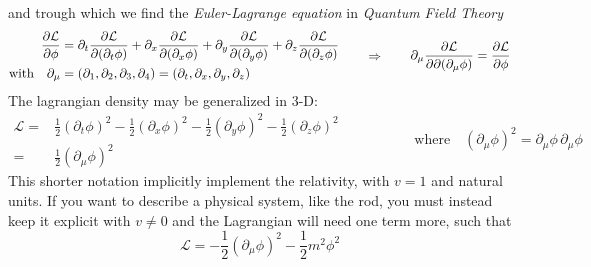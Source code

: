 \documentclass[class=article]{standalone}
\begin{document}
and trough which we find the \emph{Euler-Lagrange equation} in \emph{Quantum Field Theory}
\begin{equation*}
\begin{split}
\pdv{\mathcal{L}}{\phi} & = \partial_t \pdv{\mathcal{L}}{(\partial_t \phi)} + \partial_x \pdv{\mathcal{L}}{(\partial_x \phi)}  
+\partial_y \pdv{\mathcal{L}}{(\partial_y \phi)} +\partial_z \pdv{\mathcal{L}}{(\partial_z \phi)} \\
\mbox{with} \quad \partial_{\mu} & = (\partial_1, \partial_2, \partial_3, \partial_4) = (\partial_t, \partial_x, \partial_y, \partial_z)
\end{split}
\quad\quad\Rightarrow\quad\quad
\begin{split}
\partial_{\mu} \pdv{\mathcal{L}}{\partial (\partial_{\mu} \phi)} = \pdv{\mathcal{L}}{\phi}
\end{split}
\end{equation*}
The lagrangian density may be generalized in 3-D:
\begin{equation*}
\begin{split}
\mathcal{L} = & \frac{1}{2} (\partial_t \phi)^2 - \frac{1}{2} (\partial_x \phi)^2 - \frac{1}{2} (\partial_y \phi)^2 - \frac{1}{2} (\partial_z \phi)^2 \\
= &  \frac{1}{2} (\partial_{\mu} \phi)^2
\end{split}
\quad\quad\quad\quad\quad \mbox{where} \quad (\partial_{\mu} \phi)^2  = \partial_{\mu} \phi \,\partial_{\mu} \phi
\end{equation*}
This shorter notation implicitly implement the relativity, with $v=1$ and natural units.
If you want to describe a physical system, like the rod, you must instead keep it explicit with $v \neq 0$ 
and the Lagrangian will need one term more, such that
\begin{equation*}
\mathcal{L} = - \frac{1}{2} (\partial_{\mu} \phi)^2 - \frac{1}{2} m^2 \phi^2
\end{equation*}
\end{document}
